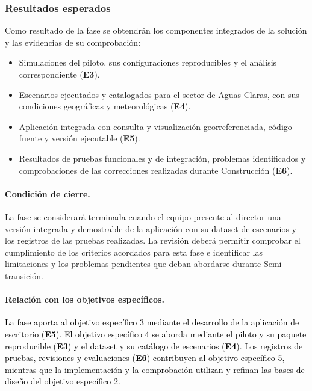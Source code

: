 \subsubsection{Resultados esperados}\label{sec:construccion-resultados}

Como resultado de la fase se obtendrán los componentes integrados de la solución y las evidencias de su comprobación:

\begin{itemize}
    \item Simulaciones del piloto, sus configuraciones reproducibles y el análisis correspondiente (\textbf{E3}).
    \item Escenarios ejecutados y catalogados para el sector de Aguas Claras, con sus condiciones geográficas y meteorológicas (\textbf{E4}).
    \item Aplicación integrada con consulta y visualización georreferenciada, código fuente y versión ejecutable (\textbf{E5}).
    \item Resultados de pruebas funcionales y de integración, problemas identificados y comprobaciones de las correcciones realizadas durante Construcción (\textbf{E6}).
\end{itemize}

\paragraph{Condición de cierre.}
La fase se considerará terminada cuando el equipo presente al director una versión integrada y demostrable de la aplicación con \textcolor{black}{su dataset de escenarios} y los registros de las pruebas realizadas. La revisión deberá permitir comprobar el cumplimiento de los criterios acordados para esta fase e identificar las limitaciones y los problemas pendientes que deban abordarse durante Semi-transición.

\paragraph{Relación con los objetivos específicos.}
\textcolor{black}{La fase aporta al objetivo específico 3 mediante el desarrollo de la aplicación de escritorio (\textbf{E5}). El objetivo específico 4 se aborda mediante el piloto y su paquete reproducible (\textbf{E3}) y el dataset y su catálogo de escenarios (\textbf{E4}). Los registros de pruebas, revisiones y evaluaciones (\textbf{E6}) contribuyen al objetivo específico 5, mientras que la implementación y la comprobación utilizan y refinan las bases de diseño del objetivo específico 2.}
